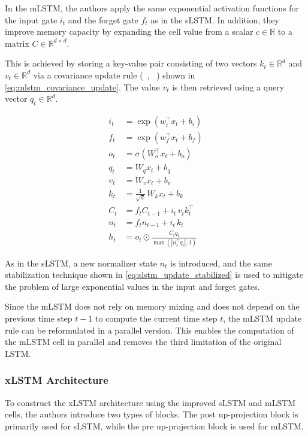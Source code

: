 \documentclass[a4paper,oneside,10pt,ngerman,english]{scrartcl}
\begin{document}
In the mLSTM, the authors apply the same exponential activation functions for the input gate $i_t$ and the forget gate $f_t$ as in the sLSTM. In addition, they improve memory capacity by expanding the cell value from a scalar $c \in \mathbb{R}$ to a matrix $C \in \mathbb{R}^{d \times d}$.

This is achieved by storing a key-value pair consisting of two vectors $k_t \in \mathbb{R}^d$ and $v_t \in \mathbb{R}^d$ via a covariance update rule (\citeauthor{covariance_update}~\cite{covariance_update}, \citeauthor{covariance_update2}~\cite{covariance_update2}) shown in \autoref{eq:mlstm_covariance_update}. The value $v_t$ is then retrieved using a query vector $q_t \in \mathbb{R}^d$.

\begin{align}
	i_t &= \exp\!\left(w_i^{\top} x_t + b_i\right) \\
	f_t &= \exp\!\left(w_f^{\top} x_t + b_f\right) \\
	o_t &= \sigma\!\left(W_o^{\top} x_t + b_o\right) \\
	q_t &= W_q x_t + b_q \\
	v_t &= W_v x_t + b_v \\
	k_t &= \frac{1}{\sqrt{d}}\, W_k x_t + b_k \\[6pt]
	\label{eq:mlstm_covariance_update}
	C_t &= f_t C_{t-1} + i_t\, v_t k_t^{\top} \\
	n_t &= f_t n_{t-1} + i_t\, k_t \\[6pt]
	h_t &= o_t \odot \frac{C_t q_t}{\max\!\left(\left| n_t^{\top} q_t \right|, 1\right)}
\end{align}

As in the sLSTM, a new normalizer state $n_t$ is introduced, and the same stabilization technique shown in \autoref{eq:slstm_update_stabilized} is used to mitigate the problem of large exponential values in the input and forget gates.

Since the mLSTM does not rely on memory mixing and does not depend on the previous time step $t-1$ to compute the current time step $t$, the mLSTM update rule can be reformulated in a parallel version. This enables the computation of the mLSTM cell in parallel and removes the third limitation of the original LSTM.

\subsubsection{xLSTM Architecture}
\label{sec:xLSTMArchitecture}

To construct the xLSTM architecture using the improved sLSTM and mLSTM cells, the authors introduce two types of blocks. The post up-projection block is primarily used for sLSTM, while the pre up-projection block is used for mLSTM.
\end{document}
